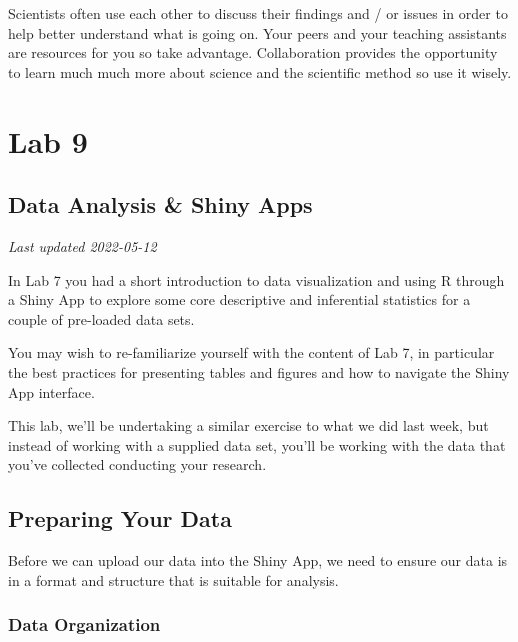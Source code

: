 \documentclass[
]{book}
\begin{document}
Scientists often use each other to discuss their findings and / or issues in order to help better understand what is going on. Your peers and your teaching assistants are resources for you so take advantage. Collaboration provides the opportunity to learn much much more about science and the scientific method so use it wisely.

\hypertarget{part-lab-9}{%
\part*{Lab 9}\label{part-lab-9}}

\hypertarget{data-analysis-shiny-apps}{%
\chapter*{Data Analysis \& Shiny Apps}\label{data-analysis-shiny-apps}}

\emph{Last updated 2022-05-12}

In Lab 7 you had a short introduction to data visualization and using R through a Shiny App to explore some core descriptive and inferential statistics for a couple of pre-loaded data sets.

You may wish to re-familiarize yourself with the content of Lab 7, in particular the best practices for presenting tables and figures and how to navigate the Shiny App interface.

This lab, we'll be undertaking a similar exercise to what we did last week, but instead of working with a supplied data set, you'll be working with the data that you've collected conducting your research.

\hypertarget{preparing-your-data}{%
\chapter*{Preparing Your Data}\label{preparing-your-data}}

Before we can upload our data into the Shiny App, we need to ensure our data is in a format and structure that is suitable for analysis.

\hypertarget{data-organization}{%
\section*{Data Organization}\label{data-organization}}
\end{document}
